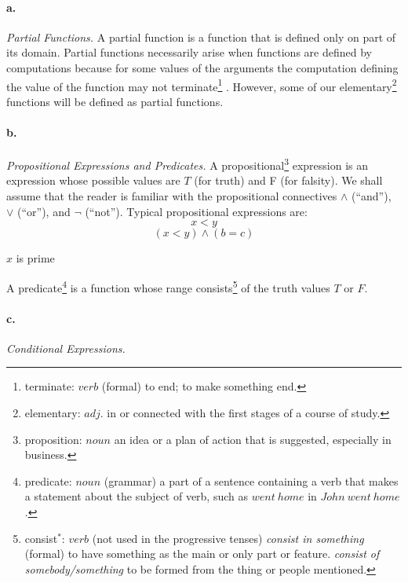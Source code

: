 \documentclass[11pt, a4paper]{article}
\begin{document}
\paragraph{a.}\textit{Partial Functions.}
A partial function is a function that is defined only on part of its
domain. Partial functions necessarily arise when functions are defined by
computations because for some values of the arguments the computation defining
the value of the function may not
terminate\footnote{terminate: $verb$ (formal) to end; to make something end.}
. However, some of our
elementary\footnote{elementary: $adj.$ in or connected with the first stages of
  a course of study.}
functions will be defined as partial functions.

\paragraph{b.}\textit{Propositional Expressions and Predicates.}
A
propositional\footnote{proposition: $noun$ an idea or a plan of action that is
  suggested, especially in business.}
expression is an expression whose possible values are $T$ (for
truth) and F (for falsity). We shall assume that the reader is familiar with the
propositional connectives $\land$ (``and''), $\lor$ (``or''), and $\lnot$
(``not''). Typical propositional expressions are:
$$ x < y $$
$$ (x < y) \land (b = c)  $$
\begin{center}$x$ is prime\end{center}

A
predicate\footnote{predicate: $noun$ (grammar) a part of a sentence containing a
  verb that makes a statement about the subject of verb, such as $went \ home$
  in $John \ went \ home$.}
is a function whose range
consists\footnote{consist$^*$: $verb$ (not used in the progressive tenses)
  \textit{consist in something} (formal) to have something as the main or only
  part or feature. \textit{consist of somebody/something} to be formed from the
  thing or people mentioned.}
of the truth values $T$ or $F$.

\paragraph{c.}\textit{Conditional Expressions.}
\end{document}
